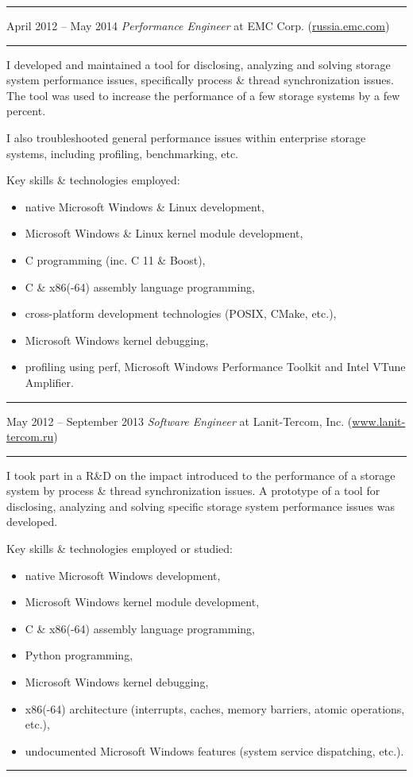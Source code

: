 \documentclass[11pt]{article}
\newcommand\CXX{%
  C\nolinebreak[4]\hspace{-.05em}\raisebox{.4ex}{\relsize{-3}{\textbf{++}}}%
}
\newcommand\CvSmallSkipLength{0.5em}
\newcommand\CvSkip[1]{\vspace{#1}}
\newcommand\CvSmallSkip{\CvSkip{\CvSmallSkipLength}}
\newcommand\CvRule{\begingroup\color{CvRuleColor}\hrule\endgroup}
\newcommand\CvWorkplaceHeader[5]{\begingroup%
  \CvRule
  \fboxsep0pt%
  \colorbox{CvWorkplaceHeaderColor}{%
    \begin{minipage}{\linewidth-2\fboxsep}%
\CvSmallSkip
#1 -- #2 \hfill \textit{#3} at #4 (\href{http://#5/}{#5})
\CvSmallSkip
    \end{minipage}%
  }%
  \CvRule
\endgroup}
\newenvironment{CvWorkplaceDescription}{%
    \begingroup\setlength\parskip{\CvSmallSkipLength}%
  }{%
    \CvSmallSkip\endgroup%
  }
\begin{document}
\CvWorkplaceHeader{April 2012}{May 2014}{Performance Engineer}{EMC Corp.}{russia.emc.com}

\begin{CvWorkplaceDescription}
I developed and maintained a tool for disclosing, analyzing and solving storage
system performance issues, specifically process \& thread synchronization
issues.
The tool was used to increase the performance of a few storage systems by a few
percent.

I also troubleshooted general performance issues within enterprise storage
systems, including profiling, benchmarking, etc.

Key skills \& technologies employed:
\begin{itemize}[noitemsep]
\item native Microsoft Windows \& Linux development,
\item Microsoft Windows \& Linux kernel module development,
\item {\CXX} programming (inc. {\CXX}11 \& Boost),
\item C \& x86(-64) assembly language programming,
\item cross-platform development technologies (POSIX, CMake, etc.),
\item Microsoft Windows kernel debugging,
\item profiling using perf, Microsoft Windows Performance Toolkit and Intel
VTune Amplifier.
\end{itemize}
\end{CvWorkplaceDescription}

\CvWorkplaceHeader{May 2012}{September 2013}{Software Engineer}{Lanit-Tercom, Inc.}{www.lanit-tercom.ru}

\begin{CvWorkplaceDescription}
I took part in a R\&D on the impact introduced to the performance of a storage
system by process \& thread synchronization issues.
A prototype of a tool for disclosing, analyzing and solving specific storage
system performance issues was developed.

Key skills \& technologies employed or studied:
\begin{itemize}[noitemsep]
\item native Microsoft Windows development,
\item Microsoft Windows kernel module development,
\item C \& x86(-64) assembly language programming,
\item Python programming,
\item Microsoft Windows kernel debugging,
\item x86(-64) architecture (interrupts, caches, memory barriers, atomic
operations, etc.),
\item undocumented Microsoft Windows features (system service dispatching,
etc.).
\end{itemize}
\end{CvWorkplaceDescription}
\CvRule
\end{document}
